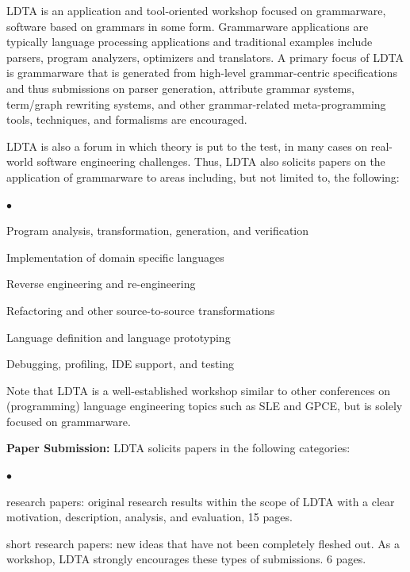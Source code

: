 \documentclass[10pt]{article}
\newenvironment{inditemlist}{
                         \begin{list}{{$\bullet$}} 
                         {\setlength{\itemsep}{0pt} 
                         \setlength{\topsep}{0pt} 
                         \setlength{\partopsep}{2pt}
                         \setlength{\leftmargin}{12pt} 
                         \setlength{\labelwidth}{8pt} 
                         \setlength{\labelsep}{2pt} 
                         \setlength{\listparindent}{0pt}
                         \setlength{\parsep}{0.07cm}
                         \usecounter{enumi} 
                         \setlength{\parskip}{0.2cm}}}{\end{list}\vspace{2mm} }
\begin{document}
\begin{minipage}[t]{5.1in}
LDTA is an application and tool-oriented workshop focused on
grammarware, software based on grammars in some form.  Grammarware
applications are typically language processing applications and
traditional examples include parsers, program analyzers, optimizers
and translators.  A primary focus of LDTA is grammarware that is
generated from high-level grammar-centric specifications and thus
submissions on parser generation, attribute grammar systems,
term/graph rewriting systems, and other grammar-related
meta-programming tools, techniques, and formalisms are encouraged.

LDTA is also a forum in which theory is put to the test, in many cases
on real-world software engineering challenges.  Thus, LDTA also
solicits papers on the application of grammarware to areas including,
but not limited to, the following:
\begin{inditemlist}
\item Program analysis, transformation, generation, and verification
\item Implementation of domain specific languages
\item Reverse engineering and re-engineering
\item Refactoring and other source-to-source transformations
\item Language definition and language prototyping
\item Debugging, profiling, IDE support, and testing
\end{inditemlist}

Note that LDTA is a well-established workshop similar to other
conferences on (programming) language engineering topics such as SLE
and GPCE, but is solely focused on grammarware.

\medskip
\textbf{Paper Submission:}
LDTA solicits papers in the following categories:
\begin{inditemlist}
\item research papers: original research results within the scope of LDTA
  with a clear motivation, description, analysis, and evaluation, 15 pages.

\item short research papers: new ideas that have not been
  completely fleshed out.  As a workshop, LDTA strongly encourages
  these types of submissions. 6 pages.


\end{inditemlist}
\end{minipage}
\end{document}
